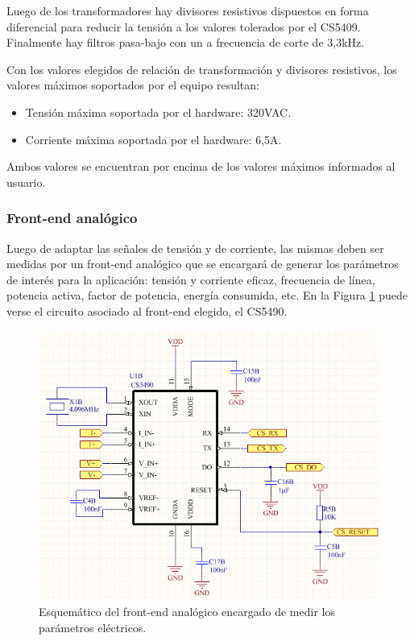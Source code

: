 Luego de los transformadores hay divisores resistivos dispuestos en forma diferencial para reducir la tensión a los valores tolerados por el CS5409. Finalmente hay filtros pasa-bajo con un a frecuencia de corte de 3,3kHz.

Con los valores elegidos de relación de transformación y divisores resistivos, los valores máximos soportados por el equipo resultan:

\begin{itemize}
\item Tensión máxima soportada por el hardware: 320VAC.
\item Corriente máxima soportada por el hardware: 6,5A.
\end{itemize}

Ambos valores se encuentran por encima de los valores máximos informados al usuario.


\subsubsection{Front-end analógico}

Luego de adaptar las señales de tensión y de corriente, las mismas deben ser medidas por un front-end analógico que se encargará de generar los parámetros de interés para la aplicación: tensión y corriente eficaz, frecuencia de línea, potencia activa, factor de potencia, energía consumida, etc. En la Figura \ref{fig:pcb_medicion_energia} puede verse el circuito asociado al front-end elegido, el CS5490.

\begin{figure}[h]
	\centering
	\includegraphics[width=14cm]{./Figures/3_1_2_pcb_medicion_energia.png}
	\caption{Esquemático del front-end analógico encargado de medir los parámetros eléctricos.}
	\label{fig:pcb_medicion_energia}
\end{figure}

